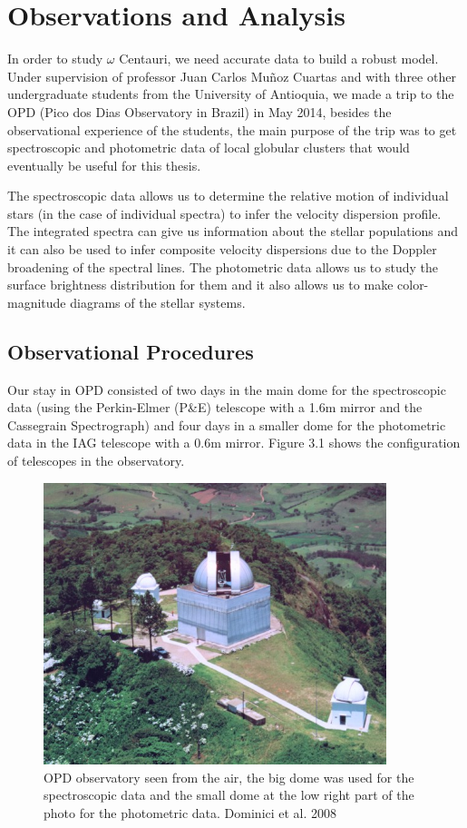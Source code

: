 
\chapter{Observations and Analysis}

In order to study $\omega$ Centauri, we need accurate data to build a robust model. Under supervision of professor Juan Carlos Mu\~noz Cuartas and with three other undergraduate students from the University of Antioquia, we made a trip to the OPD (Pico dos Dias Observatory in Brazil) in May 2014, besides the observational experience of the students, the main purpose of the trip was to get spectroscopic and photometric data of local globular clusters that would eventually be useful for this thesis.

The spectroscopic data allows us to determine the relative motion of individual stars (in the case of individual spectra) to infer the velocity dispersion profile. The integrated spectra can give us information about the stellar populations and it can also be used to infer composite velocity dispersions due to the Doppler broadening of the spectral lines. The photometric data allows us to study the surface brightness distribution for them and it also allows us to make color-magnitude diagrams of the stellar systems.

\section{Observational Procedures}

Our stay in OPD consisted of two days in the main dome for the spectroscopic data (using the Perkin-Elmer (P\&E) telescope with a 1.6m mirror and the Cassegrain Spectrograph) and four days in a smaller dome for the photometric data in the IAG telescope with a 0.6m mirror. Figure 3.1 shows the configuration of telescopes in the observatory.

\begin{figure}[H]
\centering
\includegraphics[width=10cm]{images/opd.jpg}
\caption[OPD Observatory]{OPD observatory seen from the air, the big dome was used for the spectroscopic data and the small dome at the low right part of the photo for the photometric data. Dominici et al. 2008}
\end{figure}

